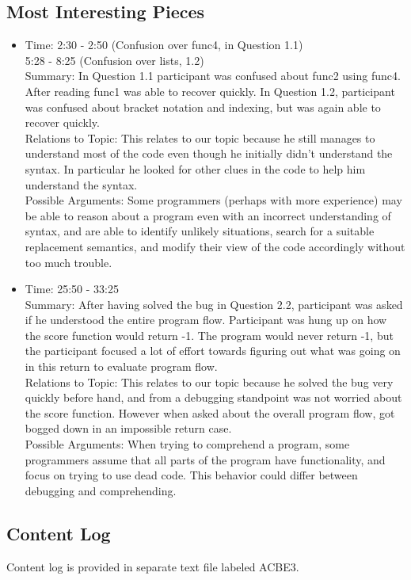 \documentclass{article}
\begin{document}
\subsection{Most Interesting Pieces}
\begin{itemize}
  \item Time:  2:30 - 2:50 (Confusion over func4,  in Question 1.1) \\
		5:28 - 8:25 (Confusion over lists, 1.2)\\
  Summary: In Question 1.1 participant was confused about  func2 using func4. After reading func1 was able to recover quickly. In Question 1.2, participant was confused about bracket notation and indexing, but was again able to recover quickly.  \\
  Relations to Topic: This relates to our topic because he still manages to understand most of the code even though he initially didn't understand the syntax. In particular he looked for other clues in the code to help him understand the syntax. \\
  Possible Arguments: Some programmers (perhaps with more experience) may be able to reason about a program even with an incorrect understanding of syntax, and are able to identify unlikely situations, search for a suitable replacement semantics, and modify their view of the code accordingly without too much trouble.
  \item Time:  25:50 - 33:25\\
  Summary: After having solved the bug in Question 2.2, participant was asked if he understood the entire program flow. Participant was hung up on how the score function would return -1. The program would never return -1, but the participant focused a lot of effort towards figuring out what was going on in this return to evaluate program flow. \\
  Relations to Topic: This relates to our topic because he solved the bug very quickly before hand,
		and from a debugging standpoint was not worried about the score function.
		However when asked about the overall program flow, got bogged down in an impossible return case. \\
  Possible Arguments: When trying to comprehend a program, some programmers assume that all parts of the program have functionality, and focus on trying to use dead code. This behavior could differ between debugging and comprehending.

\end{itemize}
\subsection{Content Log}
Content log is provided in separate text file labeled ACBE3.
\end{document}

